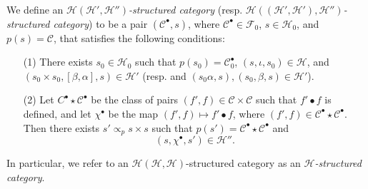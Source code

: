 \documentclass[a4paper,fleqn]{article}
\theoremstyle{plain}
\theoremstyle{definition}
\newenvironment{definition}[1]
  {\renewcommand\theinnerdefinition{#1}\innerdefinition}
  {\endinnerdefinition}
\newcommand{\CC}{\mathcal{C}}
\newcommand{\HH}{\mathcal{H}}
\newcommand{\FF}{\mathcal{F}}
\newcommand{\subs}{\mathrel{\propto}}
\begin{document}
\begin{definition}{3}
\label{definition:ii-3}
  We define an \emph{$\HH(\HH',\HH'')$-structured category} (resp. \emph{$\HH((\HH',\HH'),\HH'')$-structured category}) to be a pair $(\CC^\bullet,s)$, where $\CC^\bullet\in\FF_0$, $s\in\HH_0$, and $p(s)=\CC$, that satisfies the following conditions:
  \begin{enumerate}
    \item[\normalfont(1)]
      There exists $s_0\in\HH_0$ such that $p(s_0)=\CC_0^\bullet$, $(s,\iota,s_0)\in\HH$, and $(s_0\times s_0,[\beta,\alpha],s)\in\HH'$ (resp. and $(s_0\alpha,s),(s_0,\beta,s)\in\HH'$).

    \item[\normalfont(2)]
      Let $C^\bullet\star\CC^\bullet$ be the class of pairs $(f',f)\in\CC\times\CC$ such that $f'\bullet f$ is defined, and let $\chi^\bullet$ be the map $(f',f)\mapsto f'\bullet f$, where $(f',f)\in\CC^\bullet\star\CC^\bullet$.
      Then there exists $s'\subs_p s\times s$ such that $p(s')=\CC^\bullet\star\CC^\bullet$ and
      \[
        (s,\chi^\bullet,s')
        \in\HH''.
      \]
  \end{enumerate}

  In particular, we refer to an $\HH(\HH,\HH)$-structured category as an \emph{$\HH$-structured category}.
\end{definition}
\end{document}

